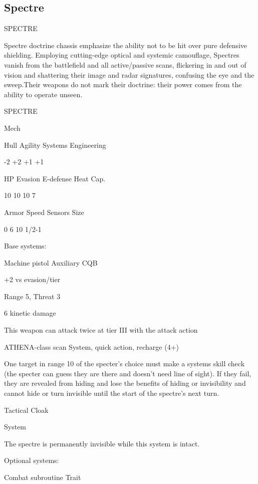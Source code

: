 \subsection{Spectre}

                                               SPECTRE

Spectre doctrine chassis emphasize the ability not to be hit over pure defensive shielding.
Employing cutting-edge optical and systemic camouflage, Spectres vanish from the battlefield
and all active/passive scans, flickering in and out of vision and shattering their image and radar
signatures, confusing the eye and the sweep.Their weapons do not mark their doctrine: their
power comes from the ability to operate unseen.


 SPECTRE

 Mech

 Hull       Agility      Systems       Engineering

 -2         +2           +1            +1

 HP         Evasion      E-defense     Heat Cap.

 10         10           10            7

 Armor      Speed        Sensors       Size

 0          6            10            1/2-1

Base systems:

Machine pistol
Auxiliary CQB

+2 vs evasion/tier

Range 5, Threat 3

6 kinetic damage

This weapon can attack twice at tier III with the attack action


ATHENA-class scan
System, quick action, recharge (4+)

One target in range 10 of the specter's choice must make a systems skill check (the specter can
guess they are there and doesn't need line of sight). If they fail, they are revealed from hiding and
lose the benefits of hiding or invisibility and cannot hide or turn invisible until the start of the
spectre's next turn.


Tactical Cloak

System

The spectre is permanently invisible while this system is intact.


Optional systems:




Combat subroutine
Trait

